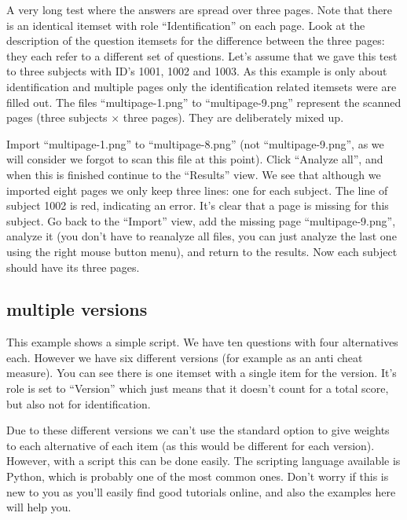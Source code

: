 \documentclass[10pt,a4paper]{article}
\begin{document}
A very long test where the answers are spread over three pages. Note that there is an identical itemset with role ``Identification'' on each page. Look at the description of the question itemsets for the difference between the three pages: they each refer to a different set of questions. Let's assume that we gave this test to three subjects with ID's 1001, 1002 and 1003. As this example is only about identification and multiple pages only the identification related itemsets were are filled out. The files ``multipage-1.png'' to ``multipage-9.png'' represent the scanned pages (three subjects $\times$ three pages). They are deliberately mixed up.

Import ``multipage-1.png'' to ``multipage-8.png'' (not ``multipage-9.png'', as we will consider we forgot to scan this file at this point). Click ``Analyze all'', and when this is finished continue to the ``Results'' view. We see that although we imported eight pages we only keep three lines: one for each subject. The line of subject 1002 is red, indicating an error. It's clear that a page is missing for this subject. Go back to the ``Import'' view, add the missing page ``multipage-9.png'', analyze it (you don't have to reanalyze all files, you can just analyze the last one using the right mouse button menu), and return to the results. Now each subject should have its three pages.


\subsection*{multiple versions}

This example shows a simple script. We have ten questions with four alternatives each. However we have six different versions (for example as an anti cheat measure). You can see there is one itemset with a single item for the version. It's role is set to ``Version'' which just means that it doesn't count for a total score, but also not for identification. 

Due to these different versions we can't use the standard option to give weights to each alternative of each item (as this would be different for each version). However, with a script this can be done easily. The scripting language available is Python, which is probably one of the most common ones. Don't worry if this is new to you as you'll easily find good tutorials online, and also the examples here will help you. 
\end{document}
